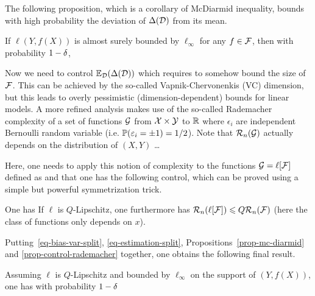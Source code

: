 The following proposition, which is a corollary of McDiarmid inequality, bounds with high probability the deviation of $\Delta(\mathcal{D})$ from its mean.

\begin{prop}\label{prop-mc-diarmid}
	If $\ell(Y,f(X))$ is almost surely bounded by $\ell_\infty$ for any $f \in \mathcal{F}$, then with probability $1-\delta$, 
\end{prop}

Now we need to control $\mathbb{E}_{\mathcal{D}}( \Delta(\mathcal{D}) )$ which requires to somehow bound the size of $\mathcal{F}$. This can be achieved by the so-called Vapnik-Chervonenkis (VC) dimension, but this leads to overly pessimistic (dimension-dependent) bounds for linear models.  A more refined analysis makes use of the so-called Rademacher complexity of a set of functions $\mathcal{G}$ from $\mathcal{X} \times \mathcal{Y}$ to $\mathbb{R}$
where $\epsilon_i$ are independent Bernoulli random variable (i.e. $\mathbb{P}(\varepsilon_i = \pm 1) = 1/2$). Note that $\mathcal{R}_n(\mathcal{G})$ actually depends on the distribution of $(X,Y)$ \ldots

Here, one needs to apply this notion of complexity to the functions $\mathcal{G} = \ell[\mathcal{F}]$ defined as
and that one has the following control, which can be proved using a simple but powerful symmetrization trick. 

\begin{prop}\label{prop-control-rademacher}
	One has
	If $\ell$ is $Q$-Lipschitz, one furthermore has $\mathcal{R}_n(\ell[\mathcal{F}]) \leqslant Q \mathcal{R}_n(\mathcal{F})$ (here the class of functions only depends on $x$).
\end{prop}

Putting~\eqref{eq-bias-var-split}, \eqref{eq-estimation-split}, Propositions~\ref{prop-mc-diarmid} and \ref{prop-control-rademacher} together, one obtains the following final result. 

\begin{thm}
	Assuming $\ell$ is $Q$-Lipschitz and bounded by $\ell_\infty$ on the support of $(Y,f(X))$, one has with probability $1-\delta$
\end{thm}

